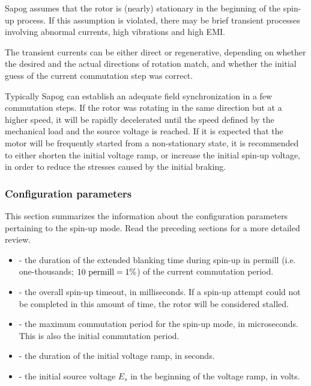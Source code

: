 \documentclass{zubaxdoc}
\begin{document}
	Sapog assumes that the rotor is (nearly) stationary in the beginning of the spin-up process.
	If this assumption is violated, there may be brief transient processes involving abnormal currents,
	high vibrations and high EMI.
	
	The transient currents can be either direct or regenerative, depending on whether the desired
	and the actual directions of rotation match, and whether the initial guess of the current
	commutation step was correct.
	
	Typically Sapog can establish an adequate field synchronization in a few commutation steps.
	If the rotor was rotating in the same direction but at a higher speed,
	it will be rapidly decelerated until the speed defined by the mechanical load and the source voltage is
	reached.
	If it is expected that the motor will be frequently started from a non-stationary state,
	it is recommended to either shorten the initial voltage ramp, or increase the initial
	spin-up voltage, in order to reduce the stresses caused by the initial braking.
	
	\subsubsection{Configuration parameters}
	
	This section summarizes the information about the configuration parameters pertaining to the spin-up mode.
	Read the preceding sections for a more detailed review.
	
	\begin{itemize}
		\item {} - the duration of the extended blanking time during spin-up in permill
		(i.e. one-thousands; $10\text{\space{}permill} = 1\% $) of the current commutation period.
		\item {} - the overall spin-up timeout, in milliseconds.
		If a spin-up attempt could not be completed in this amount of time, the rotor will be considered stalled.
		\item {} - the maximum commutation period for the spin-up mode, in microseconds.
		This is also the initial commutation period.
		\item {} - the duration of the initial voltage ramp, in seconds.
		\item {} - the initial source voltage $E_s$ in the beginning of the voltage ramp, in volts.
	\end{itemize}
	
\end{document}
